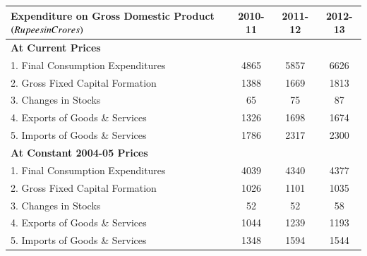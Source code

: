 \documentclass[journal,12pt,onecolumn]{IEEEtran}
\theoremstyle{remark}
\begin{document}
\begin{enumerate}
\begin{center}
\begin{tabular}{|l|c|c|c|}
\hline
Expenditure on Gross Domestic Product $\left(Rupees in Crores\right)$ & 2010-11 & 2011-12 & 2012-13 \\
\hline
\textbf{At Current Prices} & & & \\
1. Final Consumption Expenditures & 4865 & 5857 & 6626 \\
2. Gross Fixed Capital Formation & 1388 & 1669 & 1813 \\
3. Changes in Stocks & 65 & 75 & 87 \\
4. Exports of Goods \& Services & 1326 & 1698 & 1674 \\
5. Imports of Goods \& Services & 1786 & 2317 & 2300 \\
\hline
\textbf{At Constant 2004-05 Prices} & & & \\
1. Final Consumption Expenditures & 4039 & 4340 & 4377 \\
2. Gross Fixed Capital Formation & 1026 & 1101 & 1035 \\
3. Changes in Stocks & 52 & 52 & 58 \\
4. Exports of Goods \& Services & 1044 & 1239 & 1193 \\
5. Imports of Goods \& Services & 1348 & 1594 & 1544 \\


\end{tabular}
\end{center}
\end{enumerate}
\end{document}
